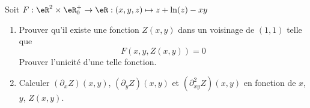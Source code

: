 
\begin{exercice}\label{exoImplicite0001}

Soit $F: \eR^2 \times \eR_0^+  \rightarrow  \eR : (x,y,z) \mapsto  z +
\ln(z) - xy$
\begin{enumerate}
\item
Prouver qu'il existe une fonction $Z(x,y)$ dans un voisinage de $(1,1)$
telle que 
\begin{equation}
    F(x,y,Z(x,y))=0
\end{equation}
Prouver l'unicité d'une telle fonction.
\item
Calculer $(\partial_x Z)(x,y)$, $(\partial_y Z)(x,y)$ et $(\partial^2_{xy}
Z)(x,y)$ en fonction de $x$, $y $, $Z(x,y)$.
\end{enumerate}

\end{exercice}
